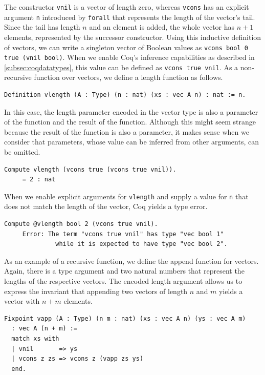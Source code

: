 \documentclass[a4paper, 11pt, fleqn, twoside]{scrreprt}
\newcommand{\cinl}[1]{\texttt{#1}}
\begin{document}
The constructor \cinl{vnil} is a vector of length zero, whereas \cinl{vcons} has an explicit argument \cinl{n} introduced by \cinl{forall} that represents the length of the vector's tail.
Since the tail has length $n$ and an element is added, the whole vector has $n + 1$ elements, represented by the successor constructor.
Using this inductive definition of vectors, we can write a singleton vector of Boolean values as \cinl{vcons bool 0 true (vnil bool)}.
When we enable Coq's inference capabilities as described in \autoref{subsec:coqdatatypes}, this value can be defined as \cinl{vcons true vnil}.
As a non-recursive function over vectors, we define a length function as follows.

\begin{verbatim}
Definition vlength (A : Type) (n : nat) (xs : vec A n) : nat := n.
\end{verbatim}

In this case, the length parameter encoded in the vector type is also a parameter of the function and the result of the function.
Although this might seem strange because the result of the function is also a parameter, it makes sense when we consider that parameters, whose value can be inferred from other arguments, can be omitted.

\begin{verbatim}
Compute vlength (vcons true (vcons true vnil)).
     = 2 : nat
\end{verbatim}

When we enable explicit arguments for \cinl{vlength} and supply a value for \cinl{n} that does not match the length of the vector, Coq yields a type error.

\begin{verbatim}
Compute @vlength bool 2 (vcons true vnil).
     Error: The term "vcons true vnil" has type "vec bool 1"
              while it is expected to have type "vec bool 2".
\end{verbatim}

As an example of a recursive function, we define the append function for vectors.
Again, there is a type argument and two natural numbers that represent the lengths of the respective vectors.
The encoded length argument allows us to express the invariant that appending two vectors of length $n$ and $m$ yields a vector with $n + m$ elements.

\begin{verbatim}
Fixpoint vapp (A : Type) (n m : nat) (xs : vec A n) (ys : vec A m) 
  : vec A (n + m) :=
  match xs with
  | vnil       => ys
  | vcons z zs => vcons z (vapp zs ys)
  end.
\end{verbatim}
\end{document}
